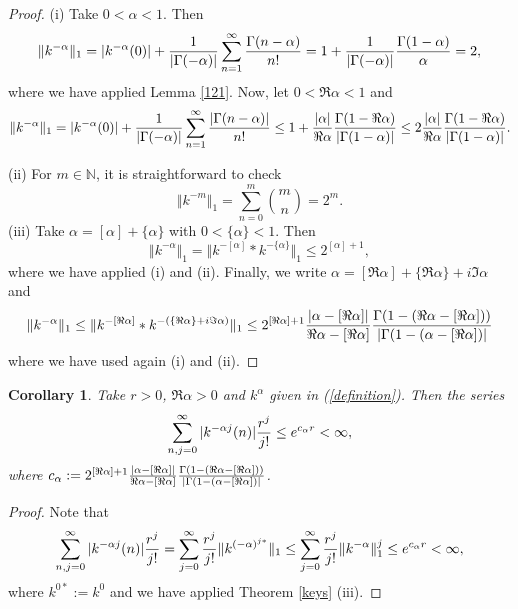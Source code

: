 \documentclass[a4paper,12pt]{amsart}
\def\Q{\mathbb Q}
\def\N{\mathbb N}
\newtheorem{corollary}[thm]{Corollary}
\theoremstyle{definition}
\theoremstyle{remark}
\begin{document}
\begin{proof} (i) Take $0<\alpha<1$. Then
$$
\Vert k^{-\alpha}\Vert_1= \vert k^{-\alpha}(0)\vert+ {1\over \vert\Gamma(-\alpha)\vert}\sum_{n=1}^\infty{\Gamma(n-\alpha)\over n!}=1+ {1\over \vert\Gamma(-\alpha)\vert}{\Gamma(1-\alpha)\over \alpha}=2,
    $$
 where we have applied Lemma \ref{121}. Now, let $0<\Re \alpha <1$ and
 $$
\Vert k^{-\alpha}\Vert_1= \vert k^{-\alpha}(0)\vert+ {1\over \vert\Gamma(-\alpha)\vert}\sum_{n=1}^\infty{\vert\Gamma(n-\alpha)\vert\over n!}\le1+ {\vert \alpha\vert\over \Re\alpha}{\Gamma(1-\Re\alpha)\over \vert\Gamma(1-\alpha)\vert}\le 2{\vert \alpha\vert\over \Re\alpha}{\Gamma(1-\Re\alpha)\over \vert\Gamma(1-\alpha)\vert}.
    $$

 \noindent (ii) For $m\in \N$, it is straightforward to check
 $$
 \Vert k^{-m}\Vert_1= \sum_{n=0}^m{m\choose n}=2^m.
 $$
\noindent (iii) Take $\alpha=[\alpha]+\{\alpha\}$ with $0<\{\alpha\}<1$. Then
$$
\Vert k^{-\alpha}\Vert_1= \Vert k^{-[\alpha]}\ast k^{-\{\alpha\}}\Vert_1\le 2^{[\alpha]+1},
$$
 where we have applied (i) and (ii). Finally, we write $\alpha= [\Re \alpha]+\{\Re \alpha\}+i\Im\alpha$ and
 $$
 \Vert k^{-\alpha}\Vert_1\le \Vert k^{-[\Re \alpha]}\ast k^{-(\{\Re \alpha\}+i\Im\alpha)}\Vert_1\le 2^{[\Re \alpha]+1}
 {\vert \alpha-[\Re\alpha]\vert\over \Re\alpha-[\Re \alpha]}{\Gamma(1-(\Re\alpha-[\Re \alpha]))\over \vert\Gamma(1-(\alpha-[\Re\alpha])\vert}
 $$
 where we have used again (i) and (ii).
\end{proof}

\begin{corollary}\label{cor} Take $r>0$,  $\Re\alpha >0$ and $k^\alpha$ given in (\ref{definition}).
    Then the series
$$
\sum_{n,j=0}^{\infty}\vert k^{-\alpha j}(n)\vert{r^j\over j! }\le e^{c_\alpha r}<\infty,
$$
 where $c_\alpha: =2^{[\Re \alpha]+1}{\vert \alpha-[\Re\alpha]\vert\over \Re\alpha-[\Re \alpha]}{\Gamma(1-(\Re\alpha-[\Re \alpha]))\over \vert\Gamma(1-(\alpha-[\Re\alpha])\vert} $.
\end{corollary}


\begin{proof} Note that
$$
\sum_{n,j=0}^{\infty}\vert k^{-\alpha j}(n)\vert{r^j\over j! }= \sum_{j=0}^{\infty}{r^j\over j! }\Vert k^{(-\alpha)^{j\ast} }\Vert_1\le  \sum_{j=0}^{\infty}{r^j\over j! }\Vert k^{-\alpha }\Vert_1^j \le  e^{c_\alpha r}<\infty,
$$
where $k^{0\ast}:=k^0$ and we have  applied Theorem \ref{keys} (iii).
\end{proof}

\end{document}
